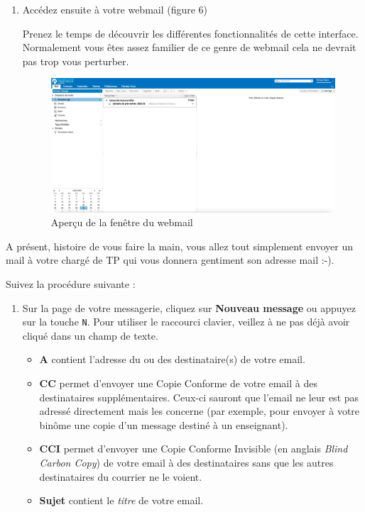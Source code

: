 \documentclass{article}
\begin{document}
\begin{exercice}
\begin{enumerate}
\item Accédez ensuite à votre webmail (figure 6)

\medskip

Prenez le temps de découvrir les différentes fonctionnalités de cette interface. Normalement vous êtes assez familier de ce genre de webmail cela ne devrait pas trop vous perturber.

\begin{figure}[h!]
    \begin{center}
    \includegraphics[scale=0.25]{mail.jpg}
    \caption{Aper\c cu de la fenêtre du webmail}
     \end{center}
\end{figure}    
\end{enumerate}

A présent, histoire de vous faire la main, vous allez tout simplement envoyer un mail à votre chargé de TP qui vous donnera gentiment son adresse mail :-). 

Suivez la procédure suivante : 

\begin{enumerate}
\item Sur la page de votre messagerie,  cliquez sur \textbf{Nouveau message} ou appuyez
   sur la touche \texttt{N}.  Pour utiliser le raccourci clavier,   veillez à ne pas déjà
   avoir cliqué dans un champ de texte.
   \begin{itemize}
   \item \textbf{A} contient l'adresse du ou des destinataire(s) de votre email.
   \item \textbf{CC} permet d'envoyer une Copie Conforme de votre email à des
      destinataires supplémentaires. Ceux-ci sauront que l'email ne leur est
      pas adressé directement mais les concerne (par exemple,   pour envoyer à
      votre binôme une copie d'un message destiné à un enseignant).
   \item \textbf{CCI} permet d'envoyer une Copie Conforme Invisible (en anglais \emph{Blind
      Carbon Copy}) de votre email à des destinataires sans que les autres
      destinataires du courrier ne le voient.
   \item \textbf{Sujet} contient le \emph{titre} de votre email.
   \end{itemize}
   

\end{enumerate}
\end{exercice}
\end{document}
